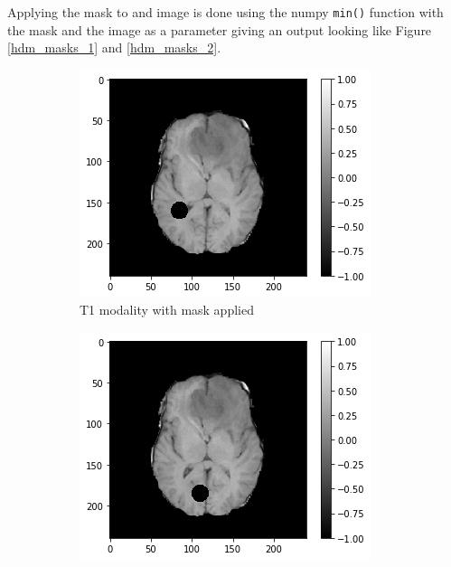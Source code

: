 Applying the mask to and image is done using the numpy \texttt{min()} function with the mask and the image as a parameter giving an output looking like Figure \ref{hdm_masks_1} and \ref{hdm_masks_2}.
\begin{figure}[H]
    \centering
    \begin{subfigure}[t]{.33\textwidth}
        \centering
        \includegraphics[width=\linewidth]{chapters/06_hdm/images_masked/masked_0.png}
        \caption{T1 modality with mask applied}
    \end{subfigure}%
    \begin{subfigure}[t]{.33\textwidth}
        \centering
        \includegraphics[width=\linewidth]{chapters/06_hdm/images_masked/masked_4.png}

\end{subfigure}
\end{figure}
